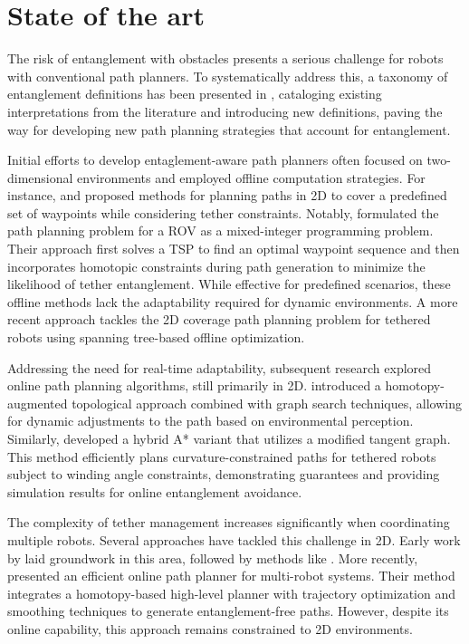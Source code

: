 \section{State of the art}
\label{sec:related_work}

The risk of entanglement with obstacles presents a serious challenge for robots with conventional path planners. To systematically address this, a taxonomy of entanglement definitions has been presented in \cite{definitions}, cataloging existing interpretations from the literature and introducing new definitions, paving the way for developing new path planning strategies that account for entanglement.

Initial efforts to develop entaglement-aware path planners often focused on two-dimensional environments and employed offline computation strategies. For instance, \cite{rov_mccammon} and \cite{mechsy2017novel} proposed methods for planning paths in 2D to cover a predefined set of waypoints while considering tether constraints. Notably, \cite{mechsy2017novel} formulated the path planning problem for a \ac{ROV} as a mixed-integer programming problem. Their approach first solves a \ac{TSP} to find an optimal waypoint sequence and then incorporates homotopic constraints during path generation to minimize the likelihood of tether entanglement. While effective for predefined scenarios, these offline methods lack the adaptability required for dynamic environments. A more recent approach \cite{peng2025spanning} tackles the 2D coverage path planning problem for tethered robots using spanning tree-based offline optimization.

Addressing the need for real-time adaptability, subsequent research explored online path planning algorithms, still primarily in 2D. \cite{kim} introduced a homotopy-augmented topological approach combined with graph search techniques, allowing for dynamic adjustments to the path based on environmental perception. Similarly, \cite{withy} developed a hybrid A* variant that utilizes a modified tangent graph. This method efficiently plans curvature-constrained paths for tethered robots subject to winding angle constraints, demonstrating guarantees and providing simulation results for online entanglement avoidance. 

The complexity of tether management increases significantly when coordinating multiple robots. Several approaches have tackled this challenge in 2D. Early work by \cite{hert1996ties} laid groundwork in this area, followed by methods like \cite{zhang2019planning}. More recently, \cite{cao2023neptune} presented an efficient online path planner for multi-robot systems. Their method integrates a homotopy-based high-level planner with trajectory optimization and smoothing techniques to generate entanglement-free paths. However, despite its online capability, this approach remains constrained to 2D environments. 

